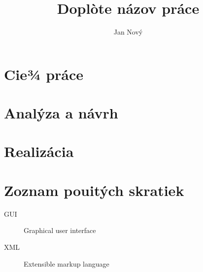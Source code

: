 \documentclass[thesis=B,slovak]{FITthesis}[2019/03/21]
\title{Doplòte názov práce}
\author{Jan Nový} %
\begin{document}

\begin{introduction}
\end{introduction}

\chapter{Cie¾ práce}

\chapter{Analýza a návrh}

\chapter{Realizácia}

\begin{conclusion}
\end{conclusion}




\appendix

\chapter{Zoznam pouitých skratiek}
\begin{description}
	\item[GUI] Graphical user interface
	\item[XML] Extensible markup language
\end{description}
\end{document}
